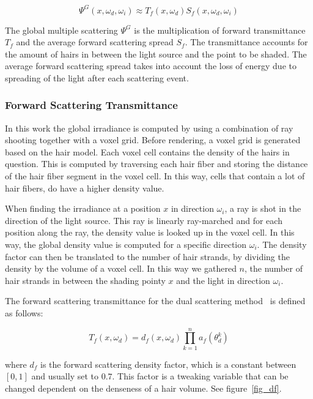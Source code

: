 \begin{equation}
\Psi^G(x, \omega_d, \omega_i) \approx T_f(x, \omega_d) S_f(x, \omega_d, \omega_i)
\end{equation}

The global multiple scattering $\Psi^G$ is the multiplication of forward transmittance $T_f$ and the average forward scattering spread $S_f$. The transmittance accounts for the amount of hairs in between the light source and the point to be shaded. The average forward scattering spread takes into account the loss of energy due to spreading of the light after each scattering event.

\subsubsection{Forward Scattering Transmittance}

In this work the global irradiance is computed by using a combination of ray shooting together with a voxel grid. Before rendering, a voxel grid is generated based on the hair model. Each voxel cell contains the density of the hairs in question. This is computed by traversing each hair fiber and storing the distance of the hair fiber segment in the voxel cell. In this way, cells that contain a lot of hair fibers, do have a higher density value.

When finding the irradiance at a position $x$ in direction $\omega_i$, a ray is shot in the direction of the light source. This ray is linearly ray-marched and for each position along the ray, the density value is looked up in the voxel cell. In this way, the global density value is computed for a specific direction $\omega_i$. The density factor can then be translated to the number of hair strands, by dividing the density by the volume of a voxel cell. In this way we gathered $n$, the number of hair strands in between the shading pointy $x$ and the light in direction $\omega_i$.

The forward scattering transmittance for the dual scattering method~\cite{zinke} is defined as follows:

\begin{equation}
T_f(x, \omega_d) = d_f(x, \omega_d) \prod_{k=1}^{n} a_f(\theta_d^k)
\label{dualscattering_Tf}
\end{equation}

where $d_f$ is the forward scattering density factor, which is a constant between $[0, 1]$ and usually set to $0.7$. This factor is a tweaking variable that can be changed dependent on the denseness of a hair volume. See figure~\ref{fig_df}.

